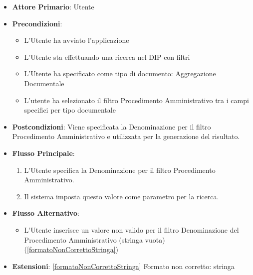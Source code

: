 \begin{itemize}
      \item \textbf{Attore Primario}: Utente
      \item \textbf{Precondizioni}: 
      \begin{itemize}            
            \item L'Utente ha avviato l'applicazione
            \item L'Utente sta effettuando una ricerca nel DIP con filtri
            \item L'Utente ha specificato come tipo di documento: Aggregazione Documentale
            \item L'utente ha selezionato il filtro Procedimento Amministrativo tra i campi specifici per tipo documentale
      \end{itemize}
      \item \textbf{Postcondizioni}: Viene specificata la Denominazione per il filtro Procedimento Amministrativo e utilizzata per la generazione del risultato.
      \item \textbf{Flusso Principale}:
      \begin{enumerate}
            \item L'Utente specifica la Denominazione per il filtro Procedimento Amministrativo.
            \item Il sistema imposta questo valore come parametro per la ricerca.
      \end{enumerate}
      \item \textbf{Flusso Alternativo}:
      \begin{itemize}
            \item L'Utente inserisce un valore non valido per il filtro Denominazione del Procedimento Amministrativo (stringa vuota) (\ref{formatoNonCorrettoStringa})
      \end{itemize}
      \item \textbf{Estensioni}: \ref{formatoNonCorrettoStringa} Formato non corretto: stringa
\end{itemize}

